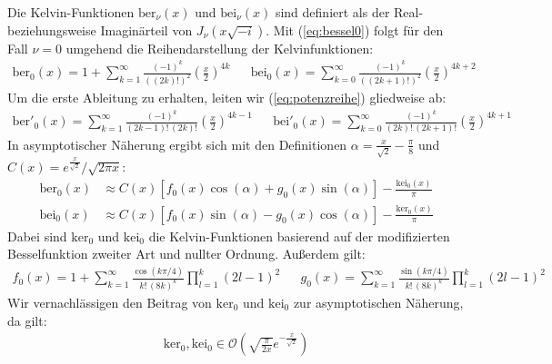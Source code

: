 \documentclass[10pt,a4paper]{article}
\begin{document}
Die Kelvin-Funktionen $\mathrm{ber}_\nu(x)$ und $\mathrm{bei}_\nu(x)$ sind definiert als der Real-
beziehungsweise Imaginärteil von $J_\nu(x \sqrt{-i} )$. Mit (\ref{eq:bessel0})
folgt für den Fall $\nu = 0$ umgehend die Reihendarstellung der Kelvinfunktionen:
\begin{align}
	\mathrm{ber}_0(x) = 1 + \sum^{\infty}_{k=1} \frac{\left( -1 \right)^k}{\left( \left(2k\right)! \right)^2} \left( \frac{x}{2} \right)^{4k}&&
	\mathrm{bei}_0(x) = \sum^{\infty}_{k=0} \frac{\left( -1 \right)^k}{\left( \left(2k+1\right)! \right)^2} \left( \frac{x}{2} \right)^{4k+2}\label{eq:potenzreihe}
\end{align}
Um die erste Ableitung zu erhalten, leiten wir (\ref{eq:potenzreihe}) gliedweise ab:
\begin{align}
	\mathrm{ber}'_0(x) = \sum^{\infty}_{k=1} \frac{\left( -1 \right)^k}{\left( 2k-1 \right)! \, \left( 2k \right)!} \left( \frac{x}{2} \right)^{4k-1}&&
	\mathrm{bei}'_0(x) = \sum^{\infty}_{k=0} \frac{\left( -1 \right)^k}{\left( 2k \right)! \, \left( 2k+1 \right)!} \left( \frac{x}{2} \right)^{4k+1}\label{eq:dpotenzreihe}
\end{align}
In asymptotischer Näherung \cite{abramowitzstegun} ergibt sich mit den Definitionen $\alpha = \frac{x}{\sqrt{2}}-\frac{\pi}{8}$ und $C(x) = e^{\frac{x}{\sqrt{2}}}/\sqrt{2 \pi x} $:
\begin{align}
	\mathrm{ber}_0(x) &\approx C(x) \left[f_0(x) \cos(\alpha) + g_0(x) \sin(\alpha) \right]\label{eq:berpotenzreiheasym}-\frac{\mathrm{kei}_0(x)}{\pi}\\
	\mathrm{bei}_0(x) &\approx C(x) \left[f_0(x) \sin(\alpha) - g_0(x) \cos(\alpha) \right]\label{eq:beipotenzreiheasym}-\frac{\mathrm{ker}_0(x)}{\pi}
\end{align}
Dabei sind $\mathrm{ker}_0$ und $\mathrm{kei}_0$ die Kelvin-Funktionen basierend auf der modifizierten Besselfunktion zweiter Art und nullter Ordnung.
Außerdem gilt:
\begin{align}
	f_0(x) = 1 + \sum^{\infty}_{k=1} \frac{\cos(k \pi / 4)}{k! \, (8k)^k} \prod^{k}_{l=1}(2l - 1)^2&&
	g_0(x) = \sum^{\infty}_{k=1} \frac{\sin(k \pi / 4)}{k! \, (8k)^k} \prod^{k}_{l=1}(2l - 1)^2\label{eq:f0g0}
\end{align}
Wir vernachlässigen den Beitrag von $\mathrm{ker}_0$ und $\mathrm{kei}_0$ zur asymptotischen Näherung, da gilt:
\begin{align}
	\mathrm{ker}_0, \mathrm{kei}_0 \in \mathcal{O}\left( \sqrt{\frac{\pi}{2 x}}e^{-\frac{x}{\sqrt{2}}} \right)
\end{align}
\end{document}

